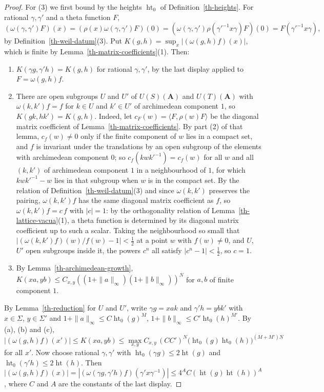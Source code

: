 \begin{proof}
For (3) we first bound by the heights $\operatorname{ht}_0$ of
Definition~\ref{th-heights}. For rational $\gamma,\gamma'$ and a theta function
$F$,
\[
(\omega(\gamma,\gamma')F)(x)=(\rho(x)\omega(\gamma,\gamma')F)(0)
=(\omega(\gamma,\gamma')\rho(\gamma'^{-1}x\gamma)F)(0)=F(\gamma'^{-1}x\gamma),
\]
by Definition~\ref{th-weil-datum}(3). Put
$K(g,h)=\sup_x|(\omega(g,h)f)(x)|$, which is finite by
Lemma~\ref{th-matrix-coefficients}(1). Then:
\begin{enumerate}
\item[(a)] $K(\gamma g,\gamma'h)=K(g,h)$ for rational $\gamma,\gamma'$, by the
  last display applied to $F=\omega(g,h)f$.
\item[(b)] There are open subgroups $U$ and $U'$ of $U(S)(\mathbf A)$ and
  $U(T)(\mathbf A)$ with $\omega(k,k')f=f$ for $k\in U$ and $k'\in U'$ of
  archimedean component $1$, so $K(gk,hk')=K(g,h)$. Indeed, let $c_F(w)=\langle F,\rho(w)F\rangle$
  be the diagonal matrix coefficient of Lemma~\ref{th-matrix-coefficients}. By
  part (2) of that lemma, $c_f(w)\neq0$ only if the finite component of $w$
  lies in a compact set, and $f$ is invariant under the translations by an open
  subgroup of the elements with archimedean component $0$; so
  $c_f(kwk'^{-1})=c_f(w)$ for all $w$ and all $(k,k')$ of archimedean
  component $1$ in a neighbourhood of $1$, for which $kwk'^{-1}-w$ lies in that
  subgroup when $w$ is in the compact set. By the relation of
  Definition~\ref{th-weil-datum}(3) and since $\omega(k,k')$ preserves the
  pairing, $\omega(k,k')f$ has the same diagonal matrix coefficient as $f$, so
  $\omega(k,k')f=c\,f$ with $|c|=1$: by the orthogonality relation of
  Lemma~\ref{th-lattice-vacua}(1), a theta function is determined by its
  diagonal matrix coefficient up to such a scalar. Taking the neighbourhood so
  small that $|(\omega(k,k')f)(w)/f(w)-1|<\tfrac12$ at a point $w$ with
  $f(w)\neq0$, and $U$, $U'$ open subgroups inside it, the powers $c^n$ all
  satisfy $|c^n-1|<\tfrac12$, so $c=1$.
\item[(c)] By Lemma~\ref{th-archimedean-growth}, $K(xa,yb)\leq
  C_{x,y}((1+\|a\|_\infty)(1+\|b\|_\infty))^N$ for $a,b$ of finite component $1$.
\end{enumerate}
By Lemma~\ref{th-reduction} for $U$ and $U'$, write $\gamma g=xak$ and
$\gamma'h=ybk'$ with $x\in\Sigma$, $y\in\Sigma'$ and
$1+\|a\|_\infty\leq C\operatorname{ht}_0(g)^M$,
$1+\|b\|_\infty\leq C'\operatorname{ht}_0(h)^{M'}$. By (a), (b) and (c),
\[
|(\omega(g,h)f)(x')|\leq K(xa,yb)\leq\max_{x,y}C_{x,y}\,(CC')^N\bigl(\operatorname{ht}_0(g)\operatorname{ht}_0(h)\bigr)^{(M+M')N}
\]
for all $x'$. Now choose rational $\gamma,\gamma'$ with
$\operatorname{ht}_0(\gamma g)\leq2\operatorname{ht}(g)$ and
$\operatorname{ht}_0(\gamma'h)\leq2\operatorname{ht}(h)$. Then
$|(\omega(g,h)f)(x)|=|(\omega(\gamma g,\gamma'h)f)(\gamma'x\gamma^{-1})|\leq
4^AC(\operatorname{ht}(g)\operatorname{ht}(h))^A$, where $C$ and $A$ are the
constants of the last display.


\end{proof}
